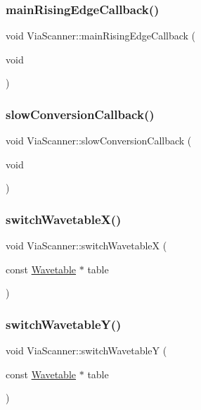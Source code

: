 \subsubsection{\texorpdfstring{main\+Rising\+Edge\+Callback()}{mainRisingEdgeCallback()}}
{\footnotesize\ttfamily void Via\+Scanner\+::main\+Rising\+Edge\+Callback (\begin{DoxyParamCaption}\item[{void}]{ }\end{DoxyParamCaption})}

\mbox{\label{class_via_scanner_ae13ff5f8cbd768a0955cac416a695430}} 
\subsubsection{\texorpdfstring{slow\+Conversion\+Callback()}{slowConversionCallback()}}
{\footnotesize\ttfamily void Via\+Scanner\+::slow\+Conversion\+Callback (\begin{DoxyParamCaption}\item[{void}]{ }\end{DoxyParamCaption})}

\mbox{\label{class_via_scanner_a53c5094aba6129ac90fc42e0e6f3a242}} 
\subsubsection{\texorpdfstring{switch\+Wavetable\+X()}{switchWavetableX()}}
{\footnotesize\ttfamily void Via\+Scanner\+::switch\+WavetableX (\begin{DoxyParamCaption}\item[{const \mbox{\hyperlink{struct_wavetable}{Wavetable}} $\ast$}]{table }\end{DoxyParamCaption})}

\mbox{\label{class_via_scanner_adfcf70c3cef485b73bf8dea27fd3b44c}} 
\subsubsection{\texorpdfstring{switch\+Wavetable\+Y()}{switchWavetableY()}}
{\footnotesize\ttfamily void Via\+Scanner\+::switch\+WavetableY (\begin{DoxyParamCaption}\item[{const \mbox{\hyperlink{struct_wavetable}{Wavetable}} $\ast$}]{table }\end{DoxyParamCaption})}

